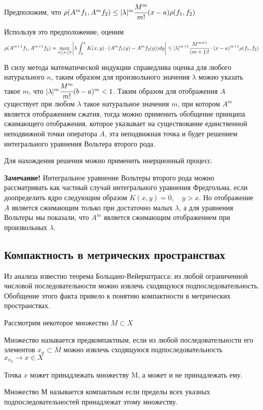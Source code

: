 \documentclass[14pt,a4paper]{extarticle}
\theoremstyle{definition}
\theoremstyle{remark}
\renewcommand{\[}{\begin{dmath*}[compact]}
\renewcommand{\]}{\end{dmath*}}
\begin{document}
Предположим, что $\rho(A^mf_1,A^mf_2)\leq |\lambda|^m\cfrac{M^m}{m!}(x-a)\rho(f_1,f_2)$

Используя это предположение, оценим
\[
{\rho(A^{m+1}f_1,A^{m+1}f_2)}
=\max_{a\leq x\leq b}\left|\lambda\int_a^xK(x,y)\cdot(A^mf_1(y)-A^mf_2(y))dy\right|
\leq|\lambda|^{m+1}\cfrac{M^{m+1}}{(m+1)!}\cdot(x-a)^{m+1}\rho(f_1,f_2)
\]

В силу метода математической индукции справедлива оценка для любого натурального $n$, таким образом для произвольного значения $\lambda$ можно указать такое $m$, что $|\lambda|^m\cfrac{M^m}{m!}(b-a)^m<1$. Таким образом для отображения $A$ существует при любом $\lambda$ такое натуральное значения $m$, при котором $A^m$ является отображением сжатия, тогда можно применить обобщение принципа сжимающего отображения, которое  указывает на существование единственной неподвижной точки оператора $A$, эта неподвижная точка и будет решением интегрального уравнения Вольтера второго рода.

Для нахождения решения можно применить инерционный процесс.

\textbf{Замечание!} Интегральное уравнение Вольтеры второго рода можно рассматривать как частный случай интегрального уравнения Фредгольма, если доопределить ядро следующим образом $K(x,y)=0,\quad y>x$. Но отображение $A$ является сжимающим только при достаточно малых $\lambda$, а для уравнения Вольтеры мы показали, что $A^m$ является сжимающим отображением при произвольных $\lambda$.

\subsection{Компактность в метрических пространствах}

Из анализа известно теорема Больцано-Вейерштрасса: из любой ограниченной числовой последовательности можно извлечь сходящуюся подпоследовательность. Обобщение этого факта привело к понятию компактности в метрических пространствах.

Рассмотрим некоторое множество $M\subset X$

Множество называется предкомпактным, если из любой последовательности его элементов ${x_n}\subset M$ можно извлечь сходящуюся подпоследовательность $x_{n_k}\to x\in X$

Точка $x$ может принадлежать множеству M, а может и не принадлежать ему.

Множество $М$ называется компактным если пределы всех указных подпоследовательностей принадлежат этому множеству.
\end{document}
